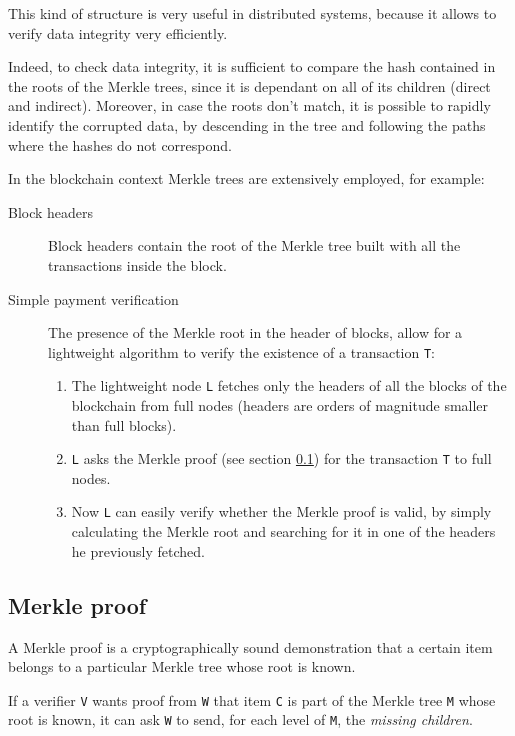 \documentclass[12pt]{article}
\begin{document}
This kind of structure is very useful in distributed systems, because it allows to verify data integrity very efficiently.

Indeed, to check data integrity, it is sufficient to compare the hash contained in the roots of the Merkle trees, since it is dependant on all of its children (direct and indirect).
Moreover, in case the roots don't match, it is possible to rapidly identify the corrupted data, by descending in the tree and following the paths where the hashes do not correspond.

In the blockchain context Merkle trees are extensively employed, for example:
\begin{description}
    \item[Block headers] Block headers contain the root of the Merkle tree built with all the transactions inside the block.
    \item[Simple payment verification] The presence of the Merkle root in the header of blocks, allow for a lightweight algorithm to verify the existence of a transaction \verb|T|:
        \begin{enumerate}
            \item The lightweight node \verb|L| fetches only the headers of all the blocks of the blockchain from full nodes (headers are orders of magnitude smaller than full blocks).
            \item \verb|L| asks the Merkle proof (see section \ref{subsection:merkle_proof}) for the transaction \verb|T| to full nodes.
            \item Now \verb|L| can easily verify whether the Merkle proof is valid, by simply calculating the Merkle root and searching for it in one of the headers he previously fetched.
        \end{enumerate} 
\end{description}

\subsection{Merkle proof} \label{subsection:merkle_proof}
A Merkle proof is a cryptographically sound demonstration that a certain item belongs to a particular Merkle tree whose root is known.

If a verifier \verb|V| wants proof from \verb|W| that item \verb|C| is part of the Merkle tree \verb|M| whose root is known, it can ask \verb|W| to send, for each level of \verb|M|, the \textit{missing children}.
\end{document}
